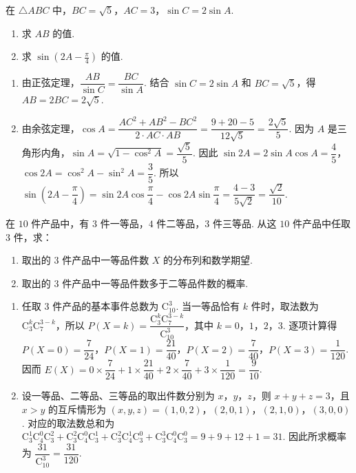 \begin{problem}
在 \(\triangle ABC\) 中，\(BC = \sqrt{5}\)，\(AC = 3\)，\(\sin C = 2\sin A\).

\begin{enumerate}
\item 求 \(AB\) 的值.
\item 求 \(\sin\left(2A-\frac{\pi}{4}\right)\) 的值.
\end{enumerate}
\end{problem}

\begin{solution}
\begin{enumerate}
\item 由正弦定理，\(\dfrac{AB}{\sin C}=\dfrac{BC}{\sin A}\). 结合 \(\sin C=2\sin A\) 和 \(BC=\sqrt5\)，得 \(AB=2BC=2\sqrt5\).
\item 由余弦定理，\(\cos A=\dfrac{AC^2+AB^2-BC^2}{2\cdot AC\cdot AB}=\dfrac{9+20-5}{12\sqrt5}=\dfrac{2\sqrt5}{5}\). 因为 \(A\) 是三角形内角，\(\sin A=\sqrt{1-\cos^2A}=\dfrac{\sqrt5}{5}\). 因此 \(\sin2A=2\sin A\cos A=\dfrac45\)，\(\cos2A=\cos^2A-\sin^2A=\dfrac35\). 所以
\(\sin\left(2A-\dfrac\pi4\right)=\sin2A\cos\dfrac\pi4-\cos2A\sin\dfrac\pi4=\dfrac{4-3}{5\sqrt2}=\dfrac{\sqrt2}{10}\).
\end{enumerate}
\end{solution}

\begin{problem}
在 \(10\) 件产品中，有 \(3\) 件一等品，\(4\) 件二等品，\(3\) 件三等品. 从这 \(10\) 件产品中任取 \(3\) 件，求：

\begin{enumerate}
\item 取出的 \(3\) 件产品中一等品件数 \(X\) 的分布列和数学期望.
\item 取出的 \(3\) 件产品中一等品件数多于二等品件数的概率.
\end{enumerate}
\end{problem}

\begin{solution}
\begin{enumerate}
\item 任取 \(3\) 件产品的基本事件总数为 \(\mathrm C_{10}^3\). 当一等品恰有 \(k\) 件时，取法数为 \(\mathrm C_3^k\mathrm C_7^{3-k}\)，所以
\(P(X=k)=\dfrac{\mathrm C_3^k\mathrm C_7^{3-k}}{\mathrm C_{10}^3}\)，其中 \(k=0\)，\(1\)，\(2\)，\(3\). 逐项计算得 \(P(X=0)=\dfrac7{24}\)，\(P(X=1)=\dfrac{21}{40}\)，\(P(X=2)=\dfrac7{40}\)，\(P(X=3)=\dfrac1{120}\). 因而
\(E(X)=0\times\dfrac7{24}+1\times\dfrac{21}{40}+2\times\dfrac7{40}+3\times\dfrac1{120}=\dfrac9{10}\).
\item 设一等品、二等品、三等品的取出件数分别为 \(x\)，\(y\)，\(z\)，则 \(x+y+z=3\)，且 \(x>y\) 的互斥情形为 \((x,y,z)=(1,0,2)\)，\((2,0,1)\)，\((2,1,0)\)，\((3,0,0)\). 对应的取法数总和为
\(\mathrm C_3^1\mathrm C_4^0\mathrm C_3^2+\mathrm C_3^2\mathrm C_4^0\mathrm C_3^1+\mathrm C_3^2\mathrm C_4^1\mathrm C_3^0+\mathrm C_3^3\mathrm C_4^0\mathrm C_3^0=9+9+12+1=31\).
因此所求概率为 \(\dfrac{31}{\mathrm C_{10}^3}=\dfrac{31}{120}\).
\end{enumerate}
\end{solution}

